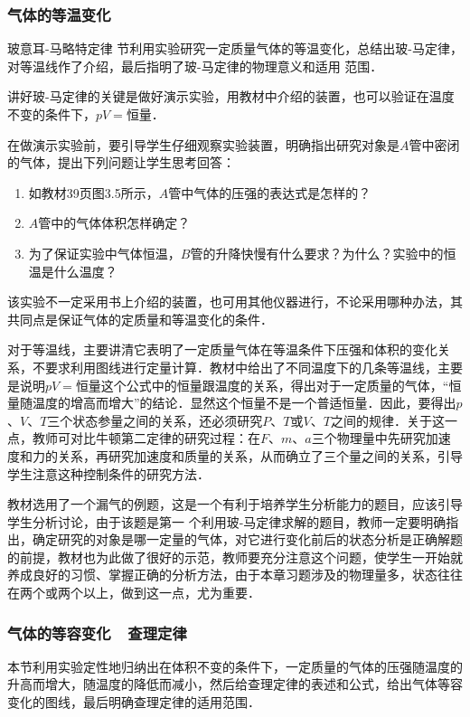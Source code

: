 \subsubsection{气体的等温变化}
 玻意耳-马略特定律 节利用实验研究一定质量气体的等温变化，总结出玻-马定律，对等温线作了介绍，最后指明了玻-马定律的物理意义和适用
 范围．

 讲好玻-马定律的关键是做好演示实验，用教材中介绍的装置，也可以验证在温度不变的条件下，$pV=$恒量．

 在做演示实验前，要引导学生仔细观察实验装置，明确指出研究对象是$A$管中密闭的气体，提出下列问题让学生思考回答：
 \begin{enumerate}
 \item 如教材39页图3.5所示，$A$管中气体的压强的表达式是怎样的？
 \item $A$管中的气体体积怎样确定？
 \item 为了保证实验中气体恒温，$B$管的升降快慢有什么要求？为什么？实验中的恒温是什么温度？
 \end{enumerate}

 该实验不一定采用书上介绍的装置，也可用其他仪器进行，不论采用哪种办法，其共同点是保证气体的定质量和等温变化的条件． 

 对于等温线，主要讲清它表明了一定质量气体在等温条件下压强和体积的变化关系，不要求利用图线进行定量计算．教材中给出了不同温度下的几条等温线，主要是说明$pV=$恒量这个公式中的恒量跟温度的关系，得出对于一定质量的气体，“恒量随温度的增高而增大”的结论．显然这个恒量不是一个普适恒量．因此，要得出$p$、$V$、$T$三个状态参量之间的关系，还必须研究$P$、$T$或$V$、$T$之间的规律．关于这一点，教师可对比牛顿第二定律的研究过程：在$F$、$m$、$a$三个物理量中先研究加速度和力的关系，再研究加速度和质量的关系，从而确立了三个量之间的关系，引导学生注意这种控制条件的研究方法．

 教材选用了一个漏气的例题，这是一个有利于培养学生分析能力的题目，应该引导学生分析讨论，由于该题是第一
 个利用玻-马定律求解的题目，教师一定要明确指出，确定研究的对象是哪一定量的气体，对它进行变化前后的状态分析是正确解题的前提，教材也为此做了很好的示范，教师要充分注意这个问题，使学生一开始就养成良好的习惯、掌握正确的分析方法，由于本章习题涉及的物理量多，状态往往在两个或两个以上，做到这一点，尤为重要．

\subsubsection{气体的等容变化~~查理定律}

本节利用实验定性地归纳出在体积不变的条件下，一定质量的气体的压强随温度的升高而增大，随温度的降低而减小，然后给查理定律的表述和公式，给出气体等容变化的图线，最后明确查理定律的适用范围．

